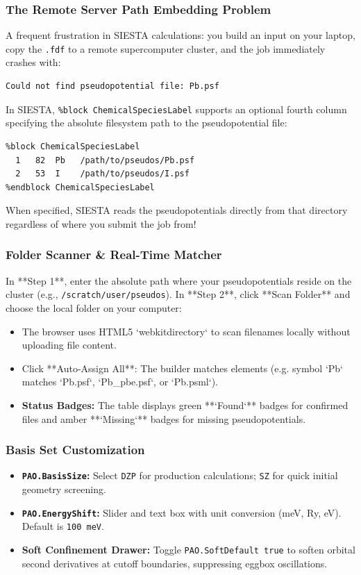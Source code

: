 \documentclass[11pt,a4paper]{article}
\begin{document}
\subsubsection{The Remote Server Path Embedding Problem}
A frequent frustration in SIESTA calculations: you build an input on your laptop, copy the \texttt{.fdf} to a remote supercomputer cluster, and the job immediately crashes with:
\begin{verbatim}
Could not find pseudopotential file: Pb.psf
\end{verbatim}
In SIESTA, \texttt{\%block ChemicalSpeciesLabel} supports an optional fourth column specifying the absolute filesystem path to the pseudopotential file:
\begin{lstlisting}
%block ChemicalSpeciesLabel
  1   82  Pb   /path/to/pseudos/Pb.psf
  2   53  I    /path/to/pseudos/I.psf
%endblock ChemicalSpeciesLabel
\end{lstlisting}
When specified, SIESTA reads the pseudopotentials directly from that directory regardless of where you submit the job from!

\subsubsection{Folder Scanner \& Real-Time Matcher}
In **Step 1**, enter the absolute path where your pseudopotentials reside on the cluster (e.g., \texttt{/scratch/user/pseudos}).
In **Step 2**, click **Scan Folder** and choose the local folder on your computer:
\begin{itemize}[leftmargin=*]
 \item The browser uses HTML5 `webkitdirectory` to scan filenames locally without uploading file content.
 \item Click **Auto-Assign All**: The builder matches elements (e.g. symbol `Pb` matches `Pb.psf`, `Pb_pbe.psf`, or `Pb.psml`).
 \item \textbf{Status Badges:} The table displays green **`Found`** badges for confirmed files and amber **`Missing`** badges for missing pseudopotentials.
\end{itemize}

\subsubsection{Basis Set Customization}
\begin{itemize}[leftmargin=*]
 \item \textbf{\texttt{PAO.BasisSize}:} Select \texttt{DZP} for production calculations; \texttt{SZ} for quick initial geometry screening.
 \item \textbf{\texttt{PAO.EnergyShift}:} Slider and text box with unit conversion (meV, Ry, eV). Default is \texttt{100 meV}.
 \item \textbf{Soft Confinement Drawer:} Toggle \texttt{PAO.SoftDefault true} to soften orbital second derivatives at cutoff boundaries, suppressing eggbox oscillations.
\end{itemize}
\end{document}
